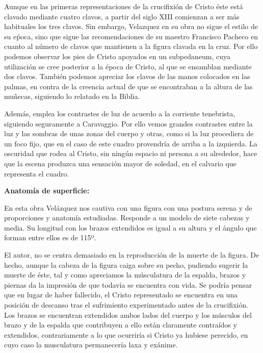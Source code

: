 Aunque en las primeras representaciones de la crucifixión de Cristo éste está clavado mediante cuatro clavos, a partir del siglo XIII comienzan a ser más habituales los tres clavos. Sin embargo, Velazquez en su obra no sigue el estilo de su eṕoca, sino que sigue las recomendaciones de su maestro Francisco Pacheco en cuanto al número de clavos que mantienen a la figura clavada en la cruz. Por ello podemos observar los pies de Cristo apoyados en un subpedaneum, cuya utilización se cree posterior a la época de Cristo, al que se ensamblan mediante dos clavos. También podemos apreciar los clavos de las manos colocados en las palmas, en contra de la creencia actual de que se encontraban a la altura de las muñecas, siguiendo lo relatado en la Biblia.

Además, emplea los contrastes de luz de acuerdo a la corriente tenebrista, siguiendo seguramente a Caravaggio. Por ello vemos grandes contrastes entre la luz y las sombras de unas zonas del cuerpo y otras, como si la luz procediera de un foco fijo, que en el caso de este cuadro provendría de arriba a la izquierda. La oscuridad que rodea al Cristo, sin ningún espacio ni persona a su alrededor, hace que la escena produzca una sensación mayor de soledad, en el calvario que representa el cuadro.

\vspace{12pt}
\textbf{Anatomía de superficie:}

En esta obra Velázquez nos cautiva con una figura con una postura serena y de proporciones y anatomía estudiadas.  Responde a un modelo de siete cabezas y media. Su longitud con los brazos extendidos es igual a su altura y el ángulo que forman entre ellos es de 115º.

El autor, no se centra demasiado en la reproducción de la muerte de la figura. De hecho, aunque la cabeza de la figura caiga sobre su pecho, pudiendo sugerir la muerte de éste, tal y como apreciamos la músculatura de la espalda, brazos y piernas da la impresión de que todavía se encuentra con vida. Se podría pensar que en lugar de haber fallecido, el Cristo representado se encuentra en una posición de descanso tras el sufrimiento experimentado antes de la crucifixión. Los brazos se encuentran extendidos ambos lados del cuerpo y los músculos del brazo y de la espalda que contribuyen a ello están claramente contraídos y extendidos, contrariamente a lo que ocurriría si Cristo ya hubiese perecido, en cuyo caso la musculatura permanecería laxa y exánime.

